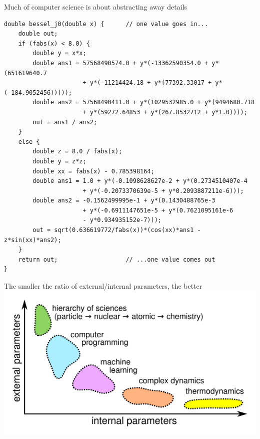 \documentclass[aspectratio=169]{beamer}
\begin{document}
\begin{frame}[fragile]{Much of computer science is about abstracting away details}
\scriptsize
\vspace{0.2 cm}
\begin{verbatim}
double bessel_j0(double x) {      // one value goes in...
    double out;
    if (fabs(x) < 8.0) {
        double y = x*x;
        double ans1 = 57568490574.0 + y*(-13362590354.0 + y*(651619640.7
                      + y*(-11214424.18 + y*(77392.33017 + y*(-184.9052456)))));
        double ans2 = 57568490411.0 + y*(1029532985.0 + y*(9494680.718
                      + y*(59272.64853 + y*(267.8532712 + y*1.0))));
        out = ans1 / ans2;
    }
    else {
        double z = 8.0 / fabs(x);
        double y = z*z;
        double xx = fabs(x) - 0.785398164;
        double ans1 = 1.0 + y*(-0.1098628627e-2 + y*(0.2734510407e-4
                      + y*(-0.2073370639e-5 + y*0.2093887211e-6)));
        double ans2 = -0.1562499995e-1 + y*(0.1430488765e-3
                      + y*(-0.6911147651e-5 + y*(0.7621095161e-6
                      - y*0.934935152e-7)));
        out = sqrt(0.636619772/fabs(x))*(cos(xx)*ans1 - z*sin(xx)*ans2);
    }
    return out;                   // ...one value comes out
}
\end{verbatim}
\end{frame}

\begin{frame}{The smaller the ratio of external/internal parameters, the better}
\vspace{0.2 cm}
\includegraphics[width=\linewidth]{internal-vs-external.pdf}
\end{frame}
\end{document}
